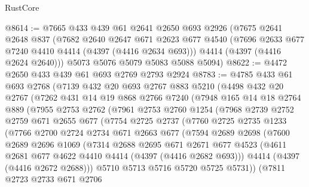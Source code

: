 \begin{lexlean}{RustCore}
\begin{coremodule}
@8614 := @7665
    @433
    @439
    @61
    @2641
    @2650
    @693
    @2926
    (@7675
      @2641
      @2648
      @837
      (@7682
        @2640
        @2647
        @671
        @2623
        @677
        @4540
        (@7696 @2633 @677 @7240 @4410 @4414 (@4397 (@4416 @2634 @693)))
        @4414
        (@4397 (@4416 @2624 @2640)))
      @5073
      @5076
      @5079
      @5083
      @5088
      @5094)
@8622 := @4472 @2650 @433 @439 @61 @693 @2769 @2793 @2924
@8783 := @4785
    @433
    @61
    @693
    @2768
    (@7139
      @432
      @20
      @693
      @2767
      @883
      @5210
      (@4498
        @432
        @20
        @2767
        (@7262
          @431
          @14
          @19
          @868
          @2766
          @7240
          (@7948
            @165
            @14
            @18
            @2764
            @889
            (@7955
              @2753
              @2762
              (@7961
                @2753
                @2760
                @1254
                (@7968
                  @2739
                  @2752
                  @2759
                  @671
                  @2655
                  @677
                  (@7754
                    @2725
                    @2737
                    (@7760
                      @2725
                      @2735
                      @1233
                      (@7766
                        @2700
                        @2724
                        @2734
                        @671
                        @2663
                        @677
                        (@7594
                          @2689
                          @2698
                          (@7600
                            @2689
                            @2696
                            @1069
                            (@7314
                              @2688
                              @2695
                              @671
                              @2671
                              @677
                              @4523
                              (@4611 @2681 @677 @4622 @4410 @4414 (@4397 (@4416 @2682 @693)))
                              @4414
                              (@4397 (@4416 @2672 @2688)))
                            @5710
                            @5713
                            @5716
                            @5720
                            @5725
                            @5731))
                        (@7811
                          @2723
                          @2733
                          @671
                          @2706

\end{coremodule}
\end{lexlean}
